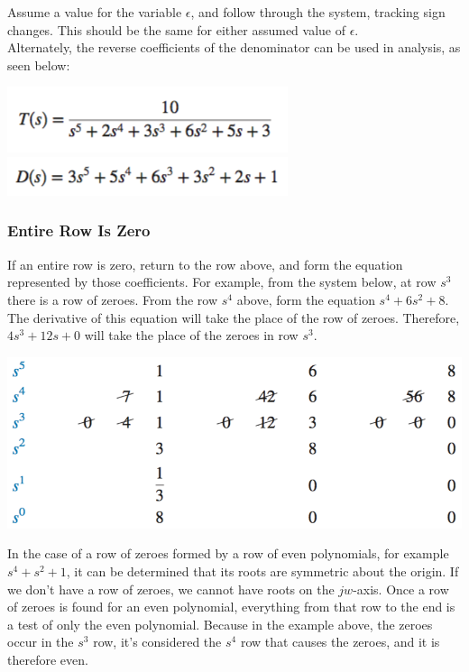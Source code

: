 \documentclass[11pt]{article}
\begin{document}
    Assume a value for the variable $\epsilon$, and follow through the system, tracking sign changes. This should be the same for either assumed value of $\epsilon$. \\ 

    Alternately, the reverse coefficients of the denominator can be used in analysis, as seen below:

    \begin{center}
        \includegraphics[width=300 px]{img/routh-recip}
        \includegraphics[width=300 px]{img/routh-recip2}
    \end{center}
    
    \subsubsection{Entire Row Is Zero}

    If an entire row is zero, return to the row above, and form the equation represented by those coefficients. For example, from the system below, at row $s^3$ there is a row of zeroes. From the row $s^4$ above, form the equation $s^4 + 6s^2 + 8$. The derivative of this equation will take the place of the row of zeroes. Therefore, $4s^3 + 12s + 0$ will take the place of the zeroes in row $s^3$.

    \begin{center}
        \includegraphics[width=300 px]{img/routh-roz}
    \end{center}

    In the case of a row of zeroes formed by a row of even polynomials, for example $s^4 + s^2 + 1$, it can be determined that its roots are symmetric about the origin. If we don't have a row of zeroes, we cannot have roots on the $jw$-axis. Once a row of zeroes is found for an even polynomial, everything from that row to the end is a test of only the even polynomial. Because in the example above, the zeroes occur in the $s^3$ row, it's considered the $s^4$ row that causes the zeroes, and it is therefore even.
\end{document}
